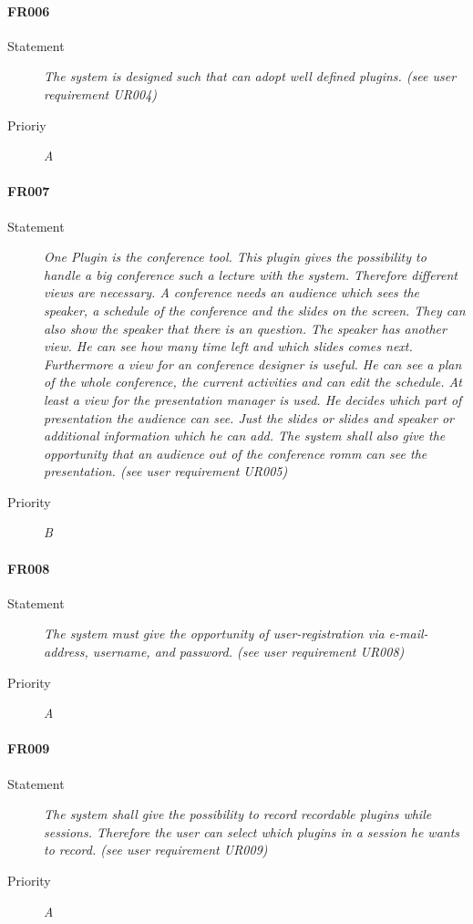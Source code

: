 \paragraph{FR006}
\begin{description}
  \item [Statement]
    \textit{The system is designed such that can adopt well defined plugins.
    (see user requirement UR004)}
  \item [Prioriy] \textit{A}
\end{description}

\paragraph{FR007}
\begin{description}
  \item [Statement] 
    \textit{One Plugin is the conference tool. This plugin gives the possibility to handle a big conference such a lecture with the system. Therefore different views are necessary. A conference needs an audience which sees the speaker, a schedule of the conference and the slides on the screen. They can also show the speaker that there is an question. The speaker has another view. He can see how many time left and which slides comes next. Furthermore a view for an conference designer is useful. He can see a plan of the whole conference, the current activities and can edit the schedule.  At least a view for the presentation manager is used. He decides which part of presentation the audience can see. Just the slides or slides and speaker or additional information which he can add. The system shall also give the opportunity that an audience out of the conference romm can see the presentation.
		(see user requirement UR005)}
  \item [Priority] \textit{B}
\end{description}

\paragraph{FR008}
\begin{description}
  \item [Statement] 
    \textit{The system must give the opportunity of user-registration via e-mail-address, username, and password.
    (see user requirement UR008)}
  \item [Priority] \textit{A}
\end{description}

\paragraph{FR009}
\begin{description}
  \item [Statement] 
    \textit{The system shall give the possibility to record \gls{recordable plugins} while sessions. Therefore the user can select which plugins in a session he wants to record. 
    (see user requirement UR009)}
  \item [Priority] \textit{A}
\end{description}

